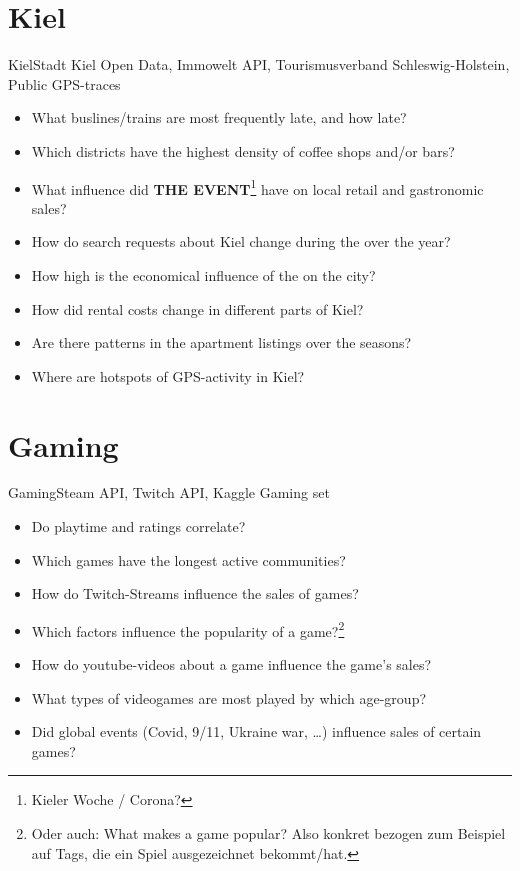     \section{Kiel}
    \begin{frame}{Kiel}{Stadt Kiel Open Data, Immowelt API, Tourismusverband Schleswig-Holstein, Public GPS-traces}
        \begin{itemize}[<+->]
            \item What buslines/trains are most frequently late, and how late?
            \item Which districts have the highest density of coffee shops and/or bars?
            \item What influence did \alert{\textsc{\bfseries THE EVENT}}\footnote{Kieler Woche / Corona?} have on local retail and gastronomic sales?
            \item How do search requests about Kiel change during the  over the year?
            \item How high is the economical influence of the  on the city?
            \item How did rental costs change in different parts of Kiel?
            \item Are there patterns in the apartment listings over the seasons?
            \item Where are hotspots of GPS-activity in Kiel?
        \end{itemize}
    \end{frame}
    \section{Gaming}
    \begin{frame}{Gaming}{Steam API, Twitch API, Kaggle Gaming set}
        \begin{itemize}[<+->]
            \item Do playtime and ratings correlate?
            \item Which games have the longest active communities?
            \item How do Twitch-Streams influence the sales of games?
            \item Which factors influence the popularity of a game?\footnote{Oder auch: What makes a game popular? Also konkret bezogen zum Beispiel auf Tags, die ein Spiel ausgezeichnet bekommt/hat.}
            \item How do youtube-videos about a game influence the game's sales?
            \item What types of videogames are most played by which age-group?
            \item Did global events (Covid, 9/11, Ukraine war, \dots) influence sales of certain games?
        \end{itemize}
    \end{frame}


